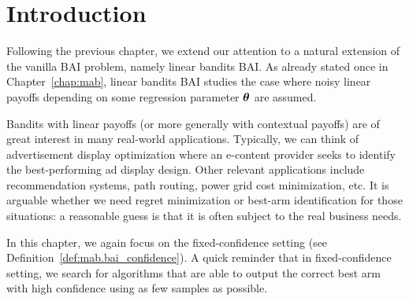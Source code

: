 \section{Introduction}\label{sec:lgc.intro}


Following the previous chapter, we extend our attention to a natural extension of the vanilla BAI problem, namely linear bandits BAI. As already stated once in Chapter~\ref{chap:mab}, linear bandits BAI studies the case where noisy linear payoffs depending on some regression parameter ${\boldsymbol \theta}$ are assumed.

Bandits with linear payoffs (or more generally with contextual payoffs) are of great interest in many real-world applications. Typically, we can think of advertisement display optimization where an e-content provider seeks to identify the best-performing ad display design. Other relevant applications include recommendation systems, path routing, power grid cost minimization, etc. It is arguable whether we need regret minimization or best-arm identification for those situations: a reasonable guess is that it is often subject to the real business needs.

In this chapter, we again focus on the fixed-confidence setting (see Definition~\ref{def:mab.bai_confidence}). A quick reminder that in fixed-confidence setting, we search for algorithms that are able to output the correct best arm with high confidence using as few samples as possible.


